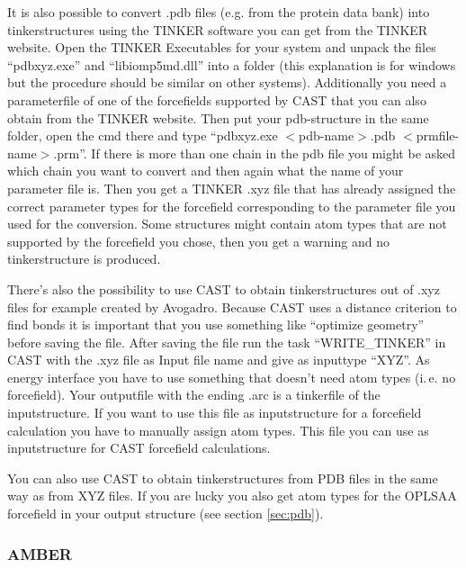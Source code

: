\documentclass[10pt,a4paper]{article} %
\begin{document}
	It is also possible to convert .pdb files (e.g. from the protein data bank\supercite{noauthor_rcsb_nodate}) into tinkerstructures using the TINKER software you can get from the TINKER website\supercite{noauthor_tinker_nodate}. Open the TINKER Executables for your system and unpack the files ``pdbxyz.exe'' and ``libiomp5md.dll'' into a folder (this explanation is for windows but the procedure should be similar on other systems). Additionally you need a parameterfile of one of the forcefields supported by \ac{CAST} that you can also obtain from the TINKER website. Then put your pdb-structure in the same folder, open the cmd there and type ``pdbxyz.exe $<$pdb-name$>$.pdb $<$prmfile-name$>$.prm''. If there is more than one chain in the pdb file you might be asked which chain you want to convert and then again what the name of your parameter file is. Then you get a TINKER .xyz file that has already assigned the correct parameter types for the forcefield corresponding to the parameter file you used for the conversion. Some structures might contain atom types that are not supported by the forcefield you chose, then you get a warning and no tinkerstructure is produced.
	
	There's also the possibility to use CAST to obtain tinkerstructures out of .xyz files for example created by Avogadro. Because CAST uses a distance criterion to find bonds it is important that you use something like ``optimize geometry'' before saving the file. After saving the file run the task ``WRITE\_TINKER'' in CAST with the .xyz file as Input file name and give as inputtype ``XYZ''. As energy interface you have to use something that doesn't need atom types (i.\,e. no forcefield). Your outputfile with the ending .arc is a tinkerfile of the inputstructure. If you want to use this file as inputstructure for a forcefield calculation you have to manually assign atom types. This file you can use as inputstructure for CAST forcefield calculations.
	
	You can also use CAST to obtain tinkerstructures from PDB files in the same way as from XYZ files. If you are lucky you also get atom types for the OPLSAA forcefield in your output structure (see section \ref{sec:pdb}).
	
	\subsubsection{AMBER}
\end{document}
